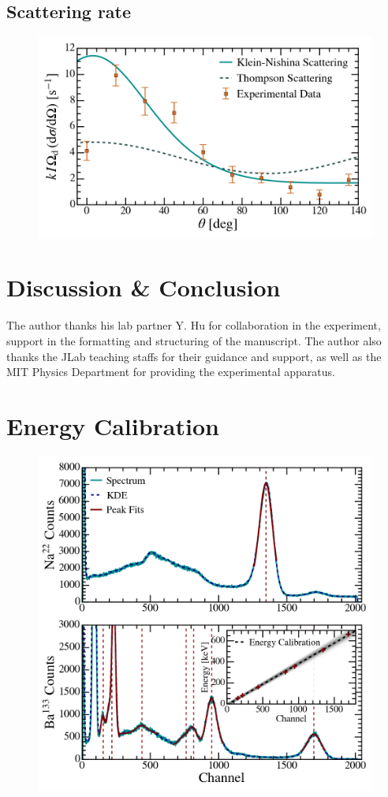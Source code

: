 \documentclass[aps,twocolumn,secnumarabic,balancelastpage,amsmath,amssymb,nofootinbib,floatfix]{revtex4-1}
\begin{document}
\subsection{Scattering rate}
\label{ssec:scattering_rate}

\begin{figure}
    \centering
    \includegraphics[width=0.49 \textwidth]{Figures/scattering_rate.png}
    \caption{}
    \label{fig:scattering_rate}
\end{figure}




\section{Discussion \& Conclusion}
\label{sec:conclusion}




\begin{acknowledgments}

The author thanks his lab partner  Y. Hu for collaboration in the experiment, support in the formatting and structuring of the manuscript. The author also thanks the JLab teaching staffs for their guidance and support, as well as the MIT Physics Department for providing the experimental apparatus.

\end{acknowledgments}





\appendix

\section{Energy Calibration}
\label{app:energy_calibration}

\begin{figure}
    \centering
    \includegraphics[width=0.49 \textwidth]{Figures/energy_calibration.png}
    \caption{}
    \label{fig:energy_calibration}
\end{figure}
\end{document}
